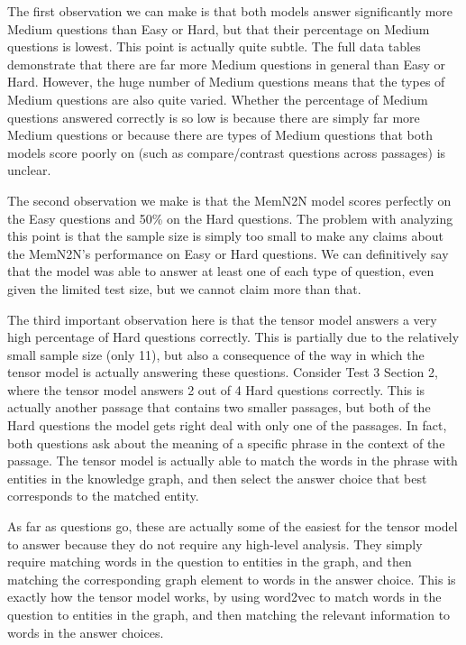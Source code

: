 \documentclass[pageno]{final_paper}
\begin{document}
The first observation we can make is that both models answer significantly more
Medium questions than Easy or Hard, but that their percentage on Medium
questions is lowest. This point is actually quite subtle. The full data tables
demonstrate that there are far more Medium questions in general than Easy or
Hard. However, the huge number of Medium questions means that the types of
Medium questions are also quite varied. Whether the percentage of Medium
questions answered correctly is so low is because there are simply far more
Medium questions or because there are types of Medium questions that both models
score poorly on (such as compare/contrast questions across passages) is unclear.

The second observation we make is that the MemN2N model scores perfectly on the
Easy questions and 50\% on the Hard questions. The problem with analyzing this
point is that the sample size is simply too small to make any claims about the
MemN2N's performance on Easy or Hard questions. We can definitively say that
the model was able to answer at least one of each type of question, even given
the limited test size, but we cannot claim more than that.

The third important observation here is that the tensor model answers a very
high percentage of Hard questions correctly. This is partially due to the
relatively small sample size (only 11), but also a consequence of the way in
which the tensor model is actually answering these questions. Consider Test 3
Section 2, where the tensor model answers 2 out of 4 Hard questions correctly.
This is actually another passage that contains two smaller passages, but both of
the Hard questions the model gets right deal with only one of the passages. In
fact, both questions ask about the meaning of a specific phrase in the context
of the passage. The tensor model is actually able to match the words in the
phrase with entities in the knowledge graph, and then select the answer choice
that best corresponds to the matched entity.

As far as questions go, these are actually some of the easiest for the tensor
model to answer because they do not require any high-level analysis. They simply
require matching words in the question to entities in the graph, and then
matching the corresponding graph element to words in the answer choice. This
is exactly how the tensor model works, by using word2vec to match words in the
question to entities in the graph, and then matching the relevant information to
words in the answer choices.
\end{document}
